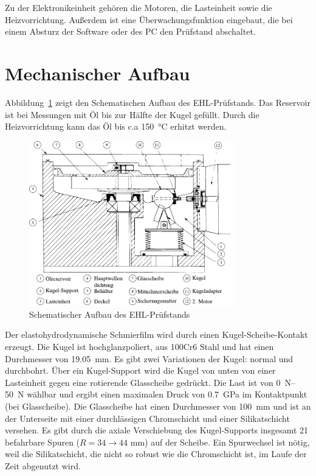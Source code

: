 Zu der Elektronikeinheit gehören die Motoren, die Lasteinheit sowie die Heizvorrichtung.
Außerdem ist eine Überwachungsfunktion eingebaut, die bei einem Absturz der Software oder des PC den Prüfstand abschaltet.

\section{Mechanischer Aufbau}
\label{sec:mechanischer_aufbau}

Abbildung~\ref{fig:ehl_aufbau} zeigt den Schematischen Aufbau des EHL-Prüfstands.
Das Reservoir ist bei Messungen mit Öl bis zur Hälfte der Kugel gefüllt.
Durch die Heizvorrichtung kann das Öl bis c.a \SI{150}{\degreeCelsius} erhitzt werden.

\begin{figure}[htb]
    \centering
    \includegraphics[width=0.8\textwidth]{./images/ehd_pruefstand_aufbau.pdf}
    \caption{Schematischer Aufbau des EHL-Prüfstands~\cite{ehl}}
    \label{fig:ehl_aufbau}
\end{figure}

Der elastohydrodynamische Schmierfilm wird durch einen Kugel-Scheibe-Kontakt erzeugt.
Die Kugel ist hochglanzpoliert, aus 100Cr6 Stahl und hat einen Durchmesser von \SI{19.05}{\milli\meter}.
Es gibt zwei Variationen der Kugel: normal und durchbohrt.
Über ein Kugel-Support wird die Kugel von unten von einer Lasteinheit gegen eine rotierende Glasscheibe gedrückt.
Die Last ist von \SIrange{0}{50}{\newton} wählbar und ergibt einen maximalen Druck von \SI{0.7}{\giga\pascal} im Kontaktpunkt (bei Glasscheibe).
Die Glasscheibe hat einen Durchmesser von \SI{100}{\milli\meter} und ist an der Unterseite mit einer durchlässigen Chromschicht und einer Silikatschicht versehen.
Es gibt durch die axiale Verschiebung des Kugel-Supports insgesamt \num{21} befahrbare Spuren ($R = 34 \rightarrow 44$ \si{\milli\meter}) auf der Scheibe.
Ein Spurwechsel ist nötig, weil die Silikatschicht, die nicht so robust wie die Chromschicht ist, im Laufe der Zeit abgenutzt wird.

